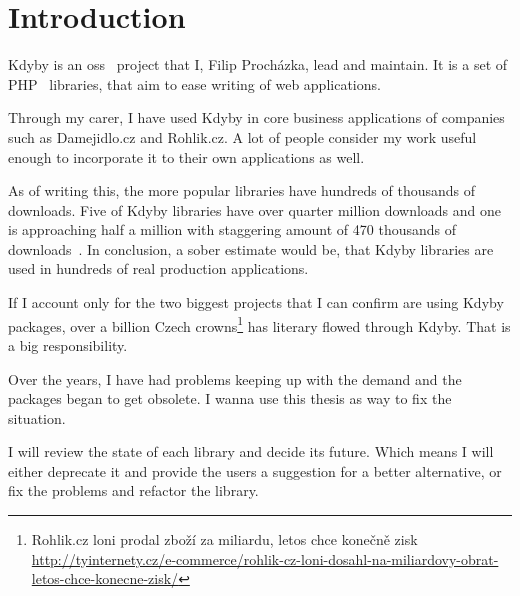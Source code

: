 \chapter{Introduction}

Kdyby is an \gls{oss}~\cite{wiki:oss} project that I, Filip Procházka, lead and maintain. It is a set of PHP~\cite{wiki:php} libraries, that aim to ease writing of web applications.

Through my carer, I have used Kdyby in core business applications of companies such as Damejidlo.cz and Rohlik.cz. A lot of people consider my work useful enough to incorporate it to their own applications as well.

As of writing this, the more popular libraries have hundreds of thousands of downloads. Five of Kdyby libraries have over quarter million downloads and one is approaching half a million with staggering amount of 470 thousands of downloads~\cite{packagist:kdyby}. In conclusion, a sober estimate would be, that Kdyby libraries are used in hundreds of real production applications.

If I account only for the two biggest projects that I can confirm are using Kdyby packages, over a billion Czech crowns\footnote{Rohlik.cz loni prodal zboží za miliardu, letos chce konečně zisk \\\url{http://tyinternety.cz/e-commerce/rohlik-cz-loni-dosahl-na-miliardovy-obrat-letos-chce-konecne-zisk/}} has literary flowed through Kdyby. That is a big responsibility.

Over the years, I have had problems keeping up with the demand and the packages began to get obsolete. I wanna use this thesis as way to fix the situation.

I will review the state of each library and decide its future. Which means I will either deprecate it and provide the users a suggestion for a better alternative, or fix the problems and refactor the library.
